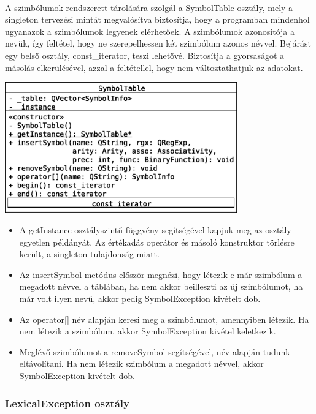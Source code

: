 \documentclass[12pt]{report}
\begin{document}
\paragraph{}
A szimbólumok rendszerett tárolására szolgál a SymbolTable osztály, mely a singleton tervezési mintát megvalósítva biztosítja, hogy a programban mindenhol ugyanazok a szimbólumok legyenek elérhetőek. A szimbólumok azonosítója a nevük, így feltétel, hogy ne szerepelhessen két szimbólum azonos névvel. Bejárást egy belső osztály, const\_iterator, teszi lehetővé. Biztosítja a gyorsaságot a másolás elkerülésével, azzal a feltétellel, hogy nem változtathatjuk az adatokat.
\begin{center}
\includegraphics[width=10cm]{pics/uml/SymbolTable}
\end{center}
\begin{itemize}
\item A getInstance osztályszintű függvény segítségével kapjuk meg az osztály egyetlen példányát. Az értékadás operátor és másoló konstruktor törlésre került, a singleton tulajdonság miatt. 
\item Az insertSymbol metódus először megnézi, hogy létezik-e már szimbólum a megadott névvel a táblában, ha nem akkor beilleszti az új szimbólumot, ha már volt ilyen nevű, akkor pedig SymbolException kivételt dob.
\item Az operator[] név alapján keresi meg a szimbólumot, amennyiben létezik. Ha nem létezik a szimbólum, akkor SymbolException kivétel keletkezik.
\item Meglévő szimbólumot a removeSymbol segítségével, név alapján tudunk eltávolítani. Ha nem létezik szimbólum a megadott névvel, akkor SymbolException kivételt dob.
\end{itemize}

\subsubsection{LexicalException osztály}
\end{document}
